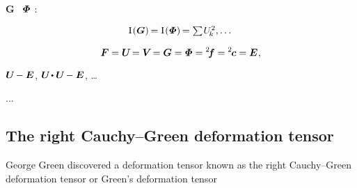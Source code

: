 $\bm{G}$
~$\mathboldPhi$
:

\noindent
\begin{equation*}
\mathrm{I}\hspace{.16ex}(\bm{G}) \hspace{-0.2ex} = \mathrm{I}\hspace{.16ex}(\mathboldPhi) \hspace{-0.2ex} = \textstyle\sum \hspace{-0.2ex} U_{\hspace{-0.25ex}k}^2, \dots
\end{equation*}


\nopagebreak\vspace{-0.2em}\begin{equation*}
\bm{F} = \bm{U} \hspace{-0.3ex} = \bm{V} \hspace{-0.3ex} = \bm{G} = \mathboldPhi = {^2}\hspace{-0.4ex}\bm{f} = {^2}\hspace{-0.2ex}\bm{c} = \UnitDyad
\hspace{.1ex}
,
\end{equation*}

\vspace{-0.2em}\noindent
{}
${\bm{U} \hspace{-0.2ex} - \bm{E}}$,
${\bm{U} \hspace{-0.3ex} \dotp \bm{U} \hspace{-0.2ex} - \UnitDyad}$, \dots

...

\subsection*{The right Cauchy\hbox{--}Green deformation tensor}

George Green discovered a deformation tensor known as the right Cauchy\hbox{--}Green deformation tensor or Green’s deformation tensor

